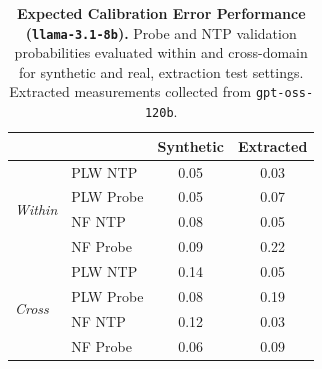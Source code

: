 \begin{table}[ht]
\centering
\begin{tabular}{ll cc}
\toprule
& & Synthetic & Extracted \\
\midrule
\multirow{4}{*}{\textit{Within}}
& PLW NTP & 0.05 & 0.03 \\
& PLW Probe & 0.05 & 0.07 \\
& NF NTP & 0.08 & 0.05 \\
& NF Probe & 0.09 & 0.22 \\
\midrule
\multirow{4}{*}{\textit{Cross}}
& PLW NTP & 0.14 & 0.05 \\
& PLW Probe & 0.08 & 0.19 \\
& NF NTP & 0.12 & 0.03 \\
& NF Probe & 0.06 & 0.09 \\
\bottomrule
\end{tabular}
\caption{\textbf{Expected Calibration Error Performance (\texttt{llama-3.1-8b}).} Probe and NTP validation probabilities evaluated within and cross-domain for synthetic and real, extraction test settings. Extracted measurements collected from \texttt{gpt-oss-120b}.}
\label{tab:llama-3.1-8b-gpt-oss-120b}
\end{table}
